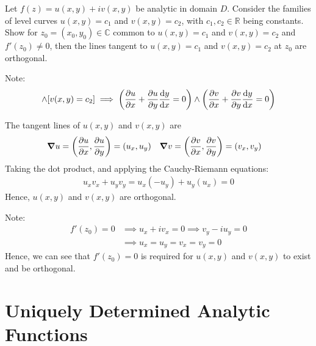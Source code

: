 \documentclass[12pt, english]{book}
\makeatletter
\renewenvironment{proof}[1][\proofname]{\par
	\pushQED{\qed}%
	\normalfont \topsep6\p@\@plus6\p@\relax
	\list{}{%
		\settowidth{\leftmargin}{\itshape\proofname:\hskip\labelsep}%
		\setlength{\labelwidth}{0pt}%
		\setlength{\itemindent}{-\leftmargin}%
		}%
	\item[\hskip\labelsep\itshape#1\@addpunct{:}]\ignorespaces
	}{\popQED\endlist\@endpefalse}
\makeatother
\begin{document}
	\begin{example}
		\label{f' neq 0 implies level curve are orthogonal Example - Complex}
		Let \(f(z) = u(x,y) + iv(x,y)\) be analytic in domain \(D\). Consider the families of level curves \(u(x,y) = c_1\) and \(v(x,y) = c_2\), with \(c_1, c_2 \in \mathbb{R}\) being constants. Show for \(z_0 = (x_0, y_0) \in \mathbb{C}\) common to \(u(x,y) = c_1\) and \(v(x,y) = c_2\) and \(f'(z_0) \neq 0\), then the lines tangent to \(u(x,y) = c_1\) and \(v(x,y) = c_2\) at \(z_0\) are orthogonal. 
		
		Note: 
		\begin{align*}
			[u(x,y) = c_1] \land [v(x,y) = c_2] \implies 
			\left(\pdv{u}{x} + \pdv{u}{y} \dv{y}{x} = 0\right) \land 
			\left(\pdv{v}{x} + \pdv{v}{y} \dv{y}{x} = 0\right)
		\end{align*}
	
		\begin{proof}{\color{Grey}
			The tangent lines of \(u(x,y)\) and \(v(x,y)\) are
			\begin{align*}
				\grad{u} &= \left(\pdv{u}{x}, \pdv{u}{y}\right) = (u_x, u_y)&
				\grad{v} &= \left(\pdv{v}{x}, \pdv{v}{y}\right) = (v_x, v_y)
			\end{align*}
			Taking the dot product, and applying the Cauchy-Riemann equations: 
			\begin{align*}
				u_x v_x + u_y v_y = u_x (-u_y) + u_y (u_x) = 0
			\end{align*}
			Hence, \(u(x,y)\) and \(v(x,y)\) are orthogonal.
			
			Note:
			\begin{align*}
				f'(z_0) = 0 
				&\implies u_x + iv_x = 0 \implies v_y - iu_y = 0 \\
				&\implies u_x = u_y = v_x = v_y = 0
			\end{align*}
			Hence, we can see that \(f'(z_0) = 0\) is required for \(u(x,y)\) and \(v(x,y)\) to exist and be orthogonal.
		}
		\end{proof}
	\end{example}
	
	
	\section{Uniquely Determined Analytic Functions} \label{Uniquely Determined Analytic Functions Section - Complex}
	
\end{document}
